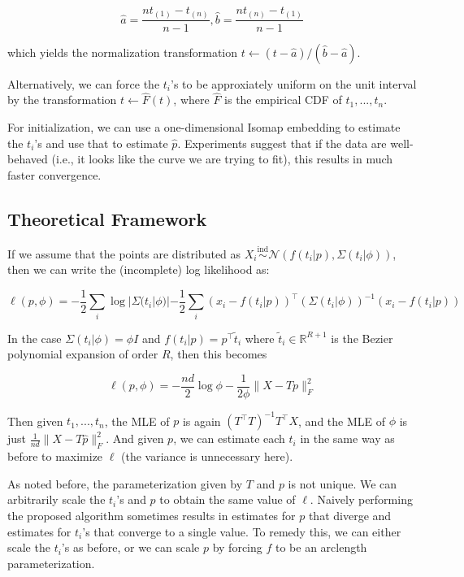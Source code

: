 \documentclass[
  11pt,
]{article}
\begin{document}
\[\hat{a} = \frac{n t_{(1)} - t_{(n)}}{n - 1},
\hat{b} = \frac{n t_{(n)} - t_{(1)}}{n - 1}\]

which yields the normalization transformation
\(t \leftarrow (t - \hat{a}) / (\hat{b} - \hat{a})\).

Alternatively, we can force the \(t_i\)'s to be approxiately uniform on
the unit interval by the transformation \(t \leftarrow \hat{F}(t)\),
where \(\hat{F}\) is the empirical CDF of \(t_1, ..., t_n\).

For initialization, we can use a one-dimensional Isomap embedding to
estimate the \(t_i\)'s and use that to estimate \(\hat{p}\). Experiments
suggest that if the data are well-behaved (i.e., it looks like the curve
we are trying to fit), this results in much faster convergence.

\hypertarget{theoretical-framework}{%
\subsection{Theoretical Framework}\label{theoretical-framework}}

If we assume that the points are distributed as
\(X_i \stackrel{\mathrm{ind}}{\sim}\mathcal{N}(f(t_i | p), \Sigma(t_i | \phi))\),
then we can write the (incomplete) log likelihood as:

\[\ell(p, \phi) = -\frac{1}{2} \sum_i \log |\Sigma(t_i | \phi)| - \frac{1}{2} \sum_i (x_i - f(t_i | p))^\top (\Sigma(t_i | \phi))^{-1} (x_i - f(t_i | p))\]

In the case \(\Sigma(t_i | \phi) = \phi I\) and
\(f(t_i | p) = p^\top \tilde{t}_i\) where
\(\tilde{t}_i \in \mathbb{R}^{R+1}\) is the Bezier polynomial expansion
of order \(R\), then this becomes

\[\ell(p, \phi) = -\frac{n d}{2} \log \phi - \frac{1}{2 \phi} \|X - T p\|^2_F\]

Then given \(t_1, ..., t_n\), the MLE of \(p\) is again
\((T^\top T)^{-1} T^\top X\), and the MLE of \(\phi\) is just
\(\frac{1}{n d} \|X - T \hat{p}\|^2_F\). And given \(p\), we can
estimate each \(t_i\) in the same way as before to maximize \(\ell\)
(the variance is unnecessary here).

As noted before, the parameterization given by \(T\) and \(p\) is not
unique. We can arbitrarily scale the \(t_i\)'s and \(p\) to obtain the
same value of \(\ell\). Naively performing the proposed algorithm
sometimes results in estimates for \(p\) that diverge and estimates for
\(t_i\)'s that converge to a single value. To remedy this, we can either
scale the \(t_i\)'s as before, or we can scale \(p\) by forcing \(f\) to
be an arclength parameterization.
\end{document}
